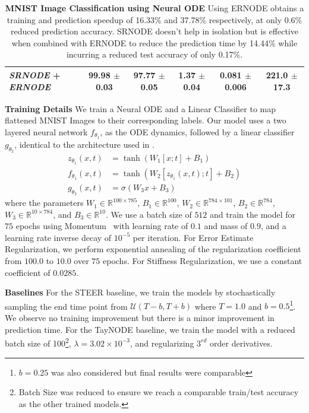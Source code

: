 \begin{table}[t]
\begin{adjustbox}{width=\linewidth,center}
\begin{tabular}{lccccc}
      \addlinespace
      \textit{SRNODE} + \textit{ERNODE} & 99.98 $\pm$ 0.03            & 97.77 $\pm$ 0.05           & 1.37 $\pm$ 0.04         & 0.081 $\pm$ 0.006           & 221.0 $\pm$ 17.3 \\
      \bottomrule
    \end{tabular}
  \end{adjustbox}
  \caption{\textbf{MNIST Image Classification using Neural ODE} Using ERNODE obtains a training and prediction speedup of 16.33\% and 37.78\% respectively, at only 0.6\% reduced prediction accuracy. SRNODE doesn't help in isolation but is effective when combined with ERNODE to reduce the prediction time by 14.44\% while incurring a reduced test accuracy of only 0.17\%.}
  \label{tab:mnist_node_globalreg}
\end{table}

\textbf{Training Details} We train a Neural ODE and a Linear Classifier to map flattened MNIST Images to their corresponding labels. Our model uses a two layered neural network $f_{\theta_1}$, as the ODE dynamics, followed by a linear classifier $g_{\theta_2}$, identical to the architecture used in \citet{kelly2020learning}.
%
\begin{align}
  z_{\theta_1}(x, t) & = \tanh(W_1 [x; t] + B_1)                  \\
  f_{\theta_1}(x, t) & = \tanh(W_2 [z_{\theta_1}(x, t); t] + B_2) \\
  g_{\theta_2}(x, t) & = \sigma(W_3 x + B_3)
\end{align}
%
where the parameters $W_1 \in \mathbb{R}^{100 \times 785}$, $B_1 \in \mathbb{R}^{100}$, $W_2 \in \mathbb{R}^{784 \times 101}$, $B_2 \in \mathbb{R}^{784}$, $W_3 \in \mathbb{R}^{10 \times 784}$, and $B_3 \in \mathbb{R}^{10}$. We use a batch size of $512$ and train the model for $75$ epochs using Momentum~\citep{qian1999momentum} with learning rate of $0.1$ and mass of $0.9$, and a learning rate inverse decay of $10^{-5}$ per iteration. For Error Estimate Regularization, we perform exponential annealing of the regularization coefficient from $100.0$ to $10.0$ over $75$ epochs. For Stiffness Regularization, we use a constant coefficient of $0.0285$.

\textbf{Baselines} For the STEER baseline, we train the models by stochastically sampling the end time point from $\mathcal{U}(T - b, T + b)$ where $T = 1.0$ and $b = 0.5$\footnote{$b=0.25$ was also considered but final results were comparable}. We observe no training improvement but there is a minor improvement in prediction time. For the TayNODE baseline, we train the model with a reduced batch size of 100\footnote{Batch Size was reduced to ensure we reach a comparable train/test accuracy as the other trained models.}, $\lambda = 3.02 \times 10^{-3}$, and regularizing $3^{rd}$ order derivatives.

